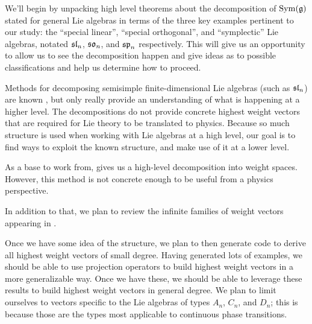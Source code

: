 \documentclass[11pt, reqno]{amsart}
\begin{document}
We'll begin by unpacking high level theorems about the decomposition of $\operatorname{Sym}(\mathfrak{g})$ stated for general Lie algebras in terms of the three key examples pertinent to our study: the ``special linear'', ``special orthogonal'', and ``symplectic'' Lie algebras, notated $\mathfrak{sl}_n$, $\mathfrak{so}_n$, and $\mathfrak{sp}_n$ respectively. This will give us an opportunity to allow us to see the decomposition happen and give ideas as to possible classifications and help us determine how to proceed.

Methods for decomposing semisimple finite-dimensional Lie algebras (such as $\mathfrak{sl}_n$) are known \cite{Dau14}, but only really provide an understanding of what is happening at a higher level. The decompositions do not provide concrete highest weight vectors that are required for Lie theory to be translated to physics. Because so much structure is used when working with Lie algebras at a high level, our goal is to find ways to exploit the known structure, and make use of it at a lower level.

As a base to work from, \cite{Dau14} gives us a high-level decomposition into weight spaces. However, this method is not concrete enough to be useful from a physics perspective.

In addition to that, we plan to review the infinite families of weight vectors appearing in \cite{C20}. %

Once we have some idea of the structure, we plan to then generate code to derive all highest weight vectors of small degree. Having generated lots of examples, we should be able to use projection operators to build highest weight vectors in a more generalizable way. Once we have these, we should be able to leverage these results to build highest weight vectors in general degree. We plan to limit ourselves to vectors specific to the Lie algebras of types $A_{n}$, $C_{n}$, and $D_{n}$; this is because those are the types most applicable to continuous phase transitions.

\end{document}
